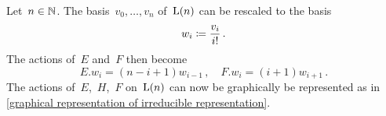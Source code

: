 \documentclass[a4paper, 11pt, oneside]{scrartcl}
\begin{document}
\begin{remark}
  Let~$n \in \mathbb{N}$.
  The basis~$v_0, \dotsc, v_n$ of~$\operatorname{L}(n)$ can be rescaled to the basis
  \[
    w_i
    \coloneqq
    \frac{v_i}{i!} \,.
  \]
  The actions of~$E$ and~$F$ then become
  \[
    E.w_i = (n-i+1) w_{i-1} \,,
    \quad
    F.w_i = (i+1) w_{i+1} \,.
  \]
  The actions of~$E$,~$H$,~$F$ on~$\operatorname{L}(n)$ can now be graphically be represented as in \cref{graphical representation of irreducible representation}.
\end{remark}
\end{document}
